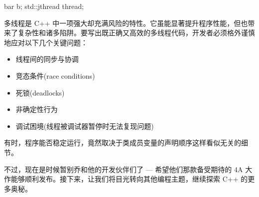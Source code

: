 \begin{cpp}
bar b;
std::jthread thread;
\end{cpp}

多线程是 C++ 中一项强大却充满风险的特性。它虽能显著提升程序性能，但也带来了复杂性和诸多陷阱。要写出既正确又高效的多线程代码，开发者必须格外谨慎地应对以下几个关键问题：

\begin{itemize}
\item 
线程间的同步与协调

\item 
竞态条件(race conditions)

\item 
死锁(deadlocks)

\item 
非确定性行为

\item 
调试困境(线程被调试器暂停时无法复现问题)
\end{itemize}

有时，程序能否稳定运行，竟然取决于类成员变量的声明顺序这样看似无关的细节。

不过，现在是时候暂别乔和他的开发伙伴们了 --- 希望他们那款备受期待的 4A 大作能够顺利发布。接下来，让我们将目光转向其他编程主题，继续探索 C++ 的更多奥秘。





















